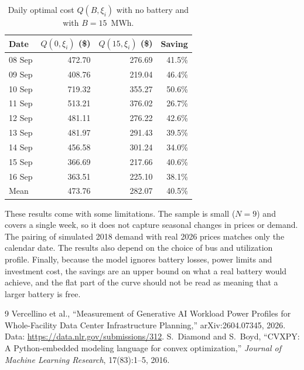 \documentclass[11pt]{article}
\begin{document}
\begin{table}[h]
  \centering
  \caption{Daily optimal cost $Q(B, \xi_i)$ with no battery and with $B = 15$~MWh.}
  \label{tab:days}
  \begin{tabular}{lrrr}
    \toprule
    Date & $Q(0, \xi_i)$ (\$) & $Q(15, \xi_i)$ (\$) & Saving \\
    \midrule
    08 Sep & 472.70 & 276.69 & 41.5\% \\
    09 Sep & 408.76 & 219.04 & 46.4\% \\
    10 Sep & 719.32 & 355.27 & 50.6\% \\
    11 Sep & 513.21 & 376.02 & 26.7\% \\
    12 Sep & 481.11 & 276.22 & 42.6\% \\
    13 Sep & 481.97 & 291.43 & 39.5\% \\
    14 Sep & 456.58 & 301.24 & 34.0\% \\
    15 Sep & 366.69 & 217.66 & 40.6\% \\
    16 Sep & 363.51 & 225.10 & 38.1\% \\
    \midrule
    Mean   & 473.76 & 282.07 & 40.5\% \\
    \bottomrule
  \end{tabular}
\end{table}

These results come with some limitations. The sample is small ($N = 9$) and covers
a single week, so it does not capture seasonal changes in prices or demand. The
pairing of simulated 2018 demand with real 2026 prices matches only the calendar
date. The results also depend on the choice of bus and utilization profile.
Finally, because the model ignores battery losses, power limits and investment
cost, the savings are an upper bound on what a real battery would achieve, and
the flat part of the curve should not be read as meaning that a larger battery is
free.

\begin{thebibliography}{9}
    Vercellino et al.,
    ``Measurement of Generative AI Workload Power Profiles for Whole-Facility
    Data Center Infrastructure Planning,''
    arXiv:2604.07345, 2026.
    Data: \url{https://data.nlr.gov/submissions/312}.
    S.~Diamond and S.~Boyd,
    ``CVXPY: A Python-embedded modeling language for convex optimization,''
    \emph{Journal of Machine Learning Research}, 17(83):1--5, 2016.
\end{thebibliography}
\end{document}
